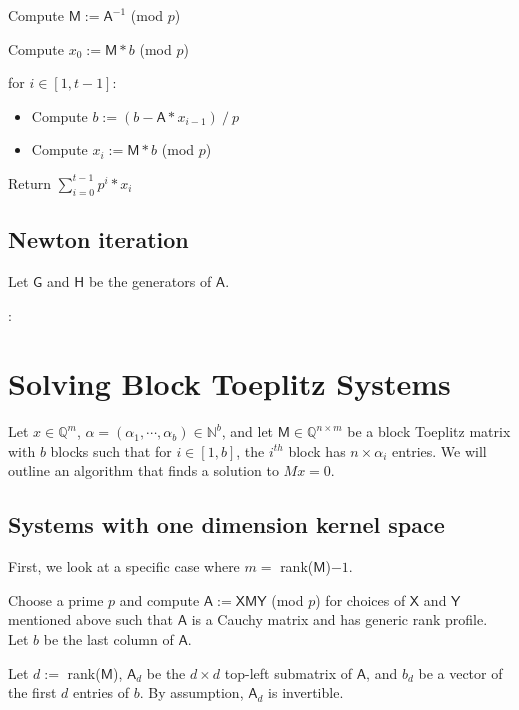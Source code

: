 \documentclass{sig-alternate}
\newcommand{\mA}{\ensuremath{\mathsf{A}}}
\newcommand{\mG}{\ensuremath{\mathsf{G}}}
\newcommand{\mH}{\ensuremath{\mathsf{H}}}
\newcommand{\mM}{\ensuremath{\mathsf{M}}}
\newcommand{\mX}{\ensuremath{\mathsf{X}}}
\newcommand{\mY}{\ensuremath{\mathsf{Y}}}
\begin{document}
\smallskip{} Compute $\mM := \mA^{-1}$ (mod $p$)

\smallskip{} Compute $x_0 := \mM * b$ (mod $p$)

\smallskip{} for $i \in [1, t-1]$:
\begin{itemize}
	\item Compute $b := (b - \mA * x_{i-1}) \mathbin{/} p$ 
	\item Compute $x_i := \mM * b$ (mod $p$)
\end{itemize}

\smallskip{} Return $\sum_{i=0}^{t-1} p^i * x_i $

\subsection{Newton iteration}
Let $\mG$ and $\mH$ be the generators of $\mA$.

\noindent{\textbf{Newton($\mG$, $\mH$, $p$, $t$)}}:

\smallskip{} 



\section{Solving Block Toeplitz Systems}
Let $x \in \mathbb{Q}^{m}$, $\alpha = (\alpha_1, \cdots, \alpha_b) \in \mathbb{N}^b$, and let 
$\mM \in \mathbb{Q}^{n \times m}$ be a block Toeplitz matrix with $b$ blocks such that for $i \in [1,b]$,
the $i^{th}$ block has $n \times \alpha_i$ entries. We will outline an algorithm that finds a solution to $Mx = 0$.

\subsection{Systems with one dimension kernel space}
First, we look at a specific case where $m = $ rank($\mM$)$-1$.

\smallskip{} Choose a prime $p$ and compute $\mA := \mX \mM \mY$ (mod $p$) 
for choices of $\mX$ and $\mY$ mentioned above such that $\mA$ is a Cauchy matrix and has generic rank profile.
Let $b$ be the last column of $\mA$.

\smallskip{} Let $d := $ rank($\mM$), $\mA_{d}$ be the $d \times d$ top-left submatrix of $\mA$,
and $b_d$ be a vector of the first $d$ entries of $b$. By assumption, $\mA_{d}$ is invertible.
\end{document}
